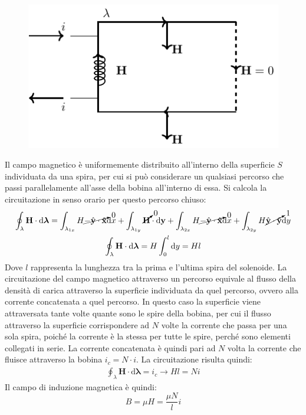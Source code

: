 \documentclass{article}
\newcommand{\vect}[1]{\boldsymbol{\mathbf{#1}}}
\newcommand{\df}{\mathrm{d}}
\numberwithin{equation}{subsection}
\begin{document}
\begin{figure}[H]%
    \centering
    \includegraphics{induttore-fisico.pdf}%
    \label{fig:induttore-fisico}
\end{figure}

Il campo magnetico è uniformemente distribuito all'interno della superficie $S$ individuata da una spira, per cui si può considerare un qualsiasi percorso che passi parallelamente 
all'asse della bobina all'interno di essa. Si calcola la circuitazione in senso orario per questo percorso chiuso:
\begin{gather*}
    \displaystyle\oint_{\lambda}\vect{H}\cdot \df\vect{\lambda}=\int_{\lambda_{1x}}H\cancelto{0}{-\hat{\vect{y}}\cdot\hat{\vect{x}}}\df  x+\int_{\lambda_{1y}}\cancelto{0}{\vect{H}}\cdot \df\vect{y}+\int_{\lambda_{2x}}H\cancelto{0}{-\hat{\vect{y}}\cdot\hat{\vect{x}}}\df  x+\int_{\lambda_{2y}}H\cancelto{1}{\hat{\vect{y}}\cdot\hat{\vect{y}}}\df  y\\
    \displaystyle\oint_{\lambda}\vect{H}\cdot \df\vect{\lambda}=H\int_0^l\df y=Hl
\end{gather*}
Dove $l$ rappresenta la lunghezza tra la prima e l'ultima spira del solenoide. La circuitazione del campo magnetico attraverso un percorso equivale al 
flusso della densità di carica attraverso la superficie individuata da quel percorso, ovvero alla corrente concatenata a quel percorso. In questo caso la superficie 
viene attraversata tante volte quante sono le spire della bobina, per cui il flusso attraverso la superficie corrispondere ad $N$ volte la corrente che passa per una sola spira, 
poiché la corrente è la stessa per tutte le spire, perché sono elementi collegati in serie. La corrente concatenata è quindi pari ad $N$ volta la corrente che fluisce 
attraverso la bobina $i_c=N\cdot i$. La circuitazione risulta quindi:
\begin{gather*}
    \displaystyle\oint_{\lambda}\vect{H}\cdot \df\vect{\lambda}=i_c\to Hl=Ni
\end{gather*}
Il campo di induzione magnetica è quindi:
\begin{equation*}
    B=\mu H=\displaystyle\frac{\mu N}{l}i
\end{equation*}
\end{document}
